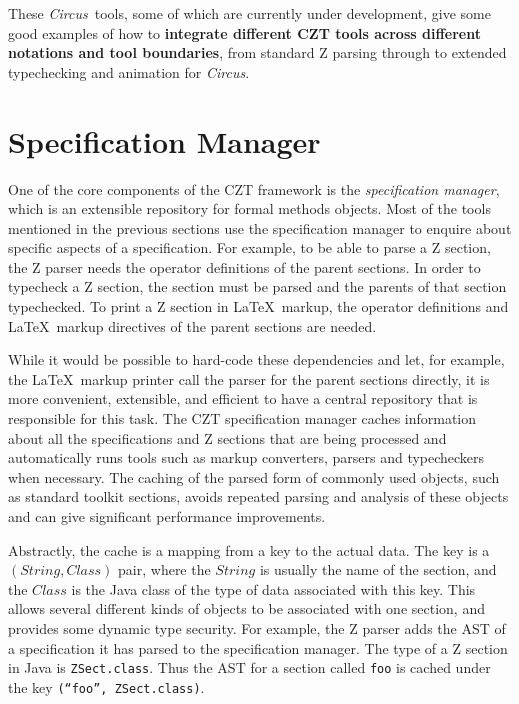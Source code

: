 \documentclass{llncs}
\newcommand{\Circus}{{\sf\slshape Circus}}
\newcommand{\Interface}[1]{\texttt{#1}}
\begin{document}
    These \Circus\ tools, some of which are currently under development,
    give some good examples of how to \textbf{integrate different CZT
    tools across different notations and tool boundaries}, from standard
    Z parsing through to extended typechecking and animation for \Circus.


\section{Specification Manager}
\label{section-manager}

  One of the core components of the CZT framework is the
  \emph{specification manager}, which is an extensible repository for
  formal methods objects.  Most of the tools mentioned in the previous
  sections use the specification manager to enquire about specific
  aspects of a specification.  For example, to be able to parse a Z
  section, the Z parser needs the operator definitions of the parent
  sections.  In order to typecheck a Z section, the section must be
  parsed and the parents of that section typechecked.  To print a Z
  section in \LaTeX\ markup, the operator definitions and \LaTeX\
  markup directives of the parent sections are needed.

  While it would be possible to hard-code these dependencies and let,
  for example, the \LaTeX\ markup printer call the parser for the
  parent sections directly, it is more convenient, extensible, and
  efficient to have a central repository that is responsible for this
  task.  The CZT specification manager caches information about all
  the specifications and Z sections that are being processed and
  automatically runs tools such as markup converters, parsers and
  typecheckers when necessary.  The caching of the parsed form of
  commonly used objects, such as standard toolkit sections, avoids
  repeated parsing and analysis of these objects and can give
  significant performance improvements.

  Abstractly, the cache is a mapping from a key to the actual data.
  The key is a $(String,Class)$ pair, where the $String$ is usually
  the name of the section, and the $Class$ is the Java class of the
  type of data associated with this key.  This allows several
  different kinds of objects to be associated with one section, and
  provides some dynamic type security.  For example, the Z parser adds
  the AST of a specification it has parsed to the specification
  manager.  The type of a Z section in Java is
  \Interface{ZSect.class}. Thus the AST for a section called
  \texttt{foo} is cached under the key
  \texttt{(``foo'',~ZSect.class)}.
\end{document}
